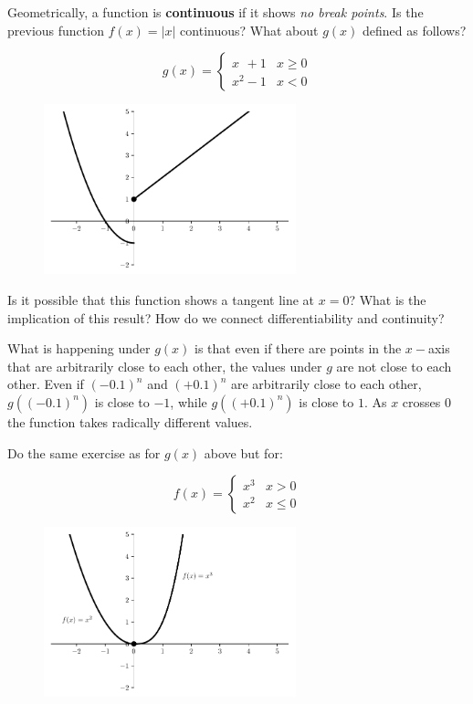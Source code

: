 \documentclass[a4paper,11pt]{article}
\theoremstyle{definition}
\theoremstyle{plain}
\begin{document}
Geometrically, a function is \textbf{continuous} if it shows \emph{no
break points}. Is the previous function \(f(x) = \lvert x \rvert\)
continuous? What about \(g(x)\) defined as follows?

\[
g(x) = \begin{cases}
x\phantom{^2}+1 & x \geq 0 \\
x^2-1 & x < 0 
\end{cases}
\]

    \begin{figure}[htbp]
    	\centering 
    		\includegraphics[width = 0.65\textwidth]{Ch2_files/Ch2_11_0.pdf}
    \end{figure}
    
    Is it possible that this function shows a tangent line at \(x = 0\)?
What is the implication of this result? How do we connect
differentiability and continuity?

What is happening under \(g(x)\) is that even if there are points in the
\(x-\)axis that are arbitrarily close to each other, the values under
\(g\) are not close to each other. Even if \((-0.1)^n\) and \((+0.1)^n\)
are arbitrarily close to each other, \(g\left((-0.1)^n\right)\) is close
to \(-1\), while \(g\left((+0.1)^n\right)\) is close to \(1\). As \(x\)
crosses \(0\) the function takes radically different values.

Do the same exercise as for \(g(x)\) above but for:

\[
f(x) = \begin{cases}
x^3 & x>0 \\
x^2 & x\leq 0
\end{cases}
\]

    \begin{figure}[htbp]
    	\centering 
    		\includegraphics[width = 0.65\textwidth]{Ch2_files/Ch2_13_0.pdf}
    \end{figure}
\end{document}
